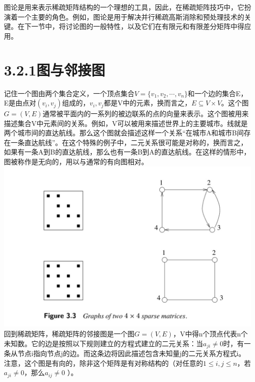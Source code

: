 \documentclass{article}
\begin{document}
图论是用来表示稀疏矩阵结构的一个理想的工具，因此，在稀疏矩阵技巧中，它扮演着一个主要的角色。例如，图论是用于解决并行稀疏高斯消除和预处理技术的关键。在下一节中，将讨论图的一般特性，以及它们在有限元和有限差分矩阵中得应用。
\newline
\section*{3.2.1图与邻接图}
记住一个图由两个集合定义，一个顶点集合$V =\{v_1,v_2,\cdots,v_n\}$和一个边的集合E，E是由点对$(v_i,v_j)$组成的，$v_i,v_j$都是V中的元素，换而言之，$E\subseteq V\times V$。这个图$G=(V,E)$通常被平面内的一系列的被边联系的点的向量来表示。这个图被用来描述集合V中元素间的关系。例如，V可以被用来描述世界上的主要城市。线就是两个城市间的直达航线。那么这个图就会描述这样一个关系“在城市A和城市B间存在一条直达航线”。在这个特殊的例子中，二元关系很可能是对称的，换而言之，如果有一条A到B的直达航线，那么也有一条B到A的直达航线。在这样的情形中，图被称作是无向的，用以与通常的有向图相对。
  \newline\newline\newline\newline\newline\newline
\includegraphics[scale=0.25]{3_3.png}
\newline\newline
回到稀疏矩阵，稀疏矩阵的邻接图是一个图$G=(V,E)$，V中得n个顶点代表n个未知数。它的边是按照以下规则建立的方程式建立的二元关系：当$a_{ji}\neq0$时，有一条从节点i指向节点j的边。而这条边将因此描述包含未知量j的二元关系方程式i。注意，这个图是有向的，除非这个矩阵是有对称结构的（对任意的$1\leq i,j\leq n$，若$a_{ji}\neq 0$，那么$a_{ij}\neq 0$ ）。
\end{document}
